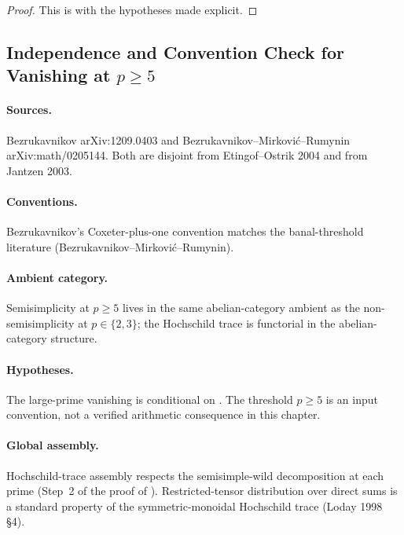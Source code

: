 \begin{proof}
This is 
with the hypotheses made explicit.
\end{proof}

\subsection{Independence and Convention Check for Vanishing at \(p\geq 5\)}

\paragraph{Sources.} Bezrukavnikov arXiv:1209.0403 and
Bezrukavnikov--Mirkovi\'c--Rumynin arXiv:math/0205144. Both are disjoint
from Etingof--Ostrik 2004 and from Jantzen 2003.

\paragraph{Conventions.} Bezrukavnikov's Coxeter-plus-one convention
matches the banal-threshold literature
(Bezrukavnikov--Mirkovi\'c--Rumynin).

\paragraph{Ambient category.} Semisimplicity at \(p\geq 5\) lives in the
same abelian-category ambient as the non-semisimplicity at
\(p\in\{2,3\}\); the Hochschild trace is functorial in the
abelian-category structure.

\paragraph{Hypotheses.} The large-prime vanishing is conditional on
. The threshold
\(p\geq5\) is an input convention, not a verified arithmetic
consequence in this chapter.

\paragraph{Global assembly.} Hochschild-trace assembly respects
the semisimple-wild decomposition at each prime (Step~2 of the
proof of ).
Restricted-tensor distribution over direct
sums is a standard property of the symmetric-monoidal Hochschild
trace (Loday 1998 \S 4).

